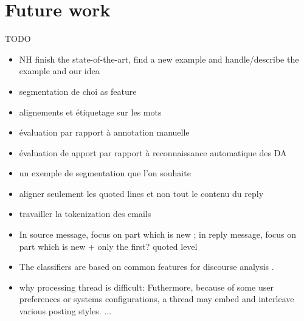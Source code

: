

\section{Future work}
\label{sec:futureWork}

TODO

\begin{itemize}
\item NH finish the state-of-the-art, find a new example and handle/describe the example and our idea
\item segmentation de choi as feature
\item alignements et étiquetage sur les mots
\item évaluation par rapport à annotation manuelle
\item évaluation de apport par rapport à reconnaissance automatique des DA 
\item un exemple de segmentation que l'on souhaite
\item aligner seulement les quoted lines et non tout le contenu du reply
\item travailler la tokenization des emails
\item In source message, focus on part which is new ; in reply message, focus on part which is new + only the first? quoted level 
\item The classifiers are based on common features for discourse analysis \cite{joty:2013:acl}.
\item why processing thread is difficult: Futhermore, because of some user preferences or systems configurations, a thread may embed and interleave various posting styles.  ...
 
\end{itemize}
